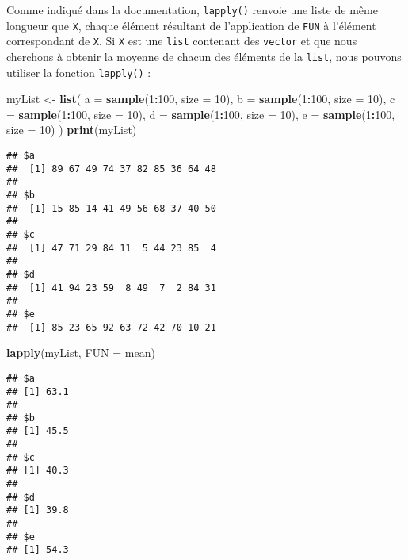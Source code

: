\documentclass[]{book}
\newenvironment{Shaded}{\begin{snugshade}}{\end{snugshade}}
\newcommand{\KeywordTok}[1]{\textcolor[rgb]{0.13,0.29,0.53}{\textbf{#1}}}
\newcommand{\DataTypeTok}[1]{\textcolor[rgb]{0.13,0.29,0.53}{#1}}
\newcommand{\DecValTok}[1]{\textcolor[rgb]{0.00,0.00,0.81}{#1}}
\newcommand{\StringTok}[1]{\textcolor[rgb]{0.31,0.60,0.02}{#1}}
\newcommand{\OperatorTok}[1]{\textcolor[rgb]{0.81,0.36,0.00}{\textbf{#1}}}
\newcommand{\NormalTok}[1]{#1}
\theoremstyle{definition}
\theoremstyle{definition}
\theoremstyle{definition}
\theoremstyle{remark}
\begin{document}
Comme indiqué dans la documentation, \texttt{lapply()} renvoie une liste
de même longueur que \texttt{X}, chaque élément résultant de
l'application de \texttt{FUN} à l'élément correspondant de \texttt{X}.
Si \texttt{X} est une \texttt{list} contenant des \texttt{vector} et que
nous cherchons à obtenir la moyenne de chacun des éléments de la
\texttt{list}, nous pouvons utiliser la fonction \texttt{lapply()} :

\begin{Shaded}
\begin{Highlighting}[]
\NormalTok{myList <-}\StringTok{ }\KeywordTok{list}\NormalTok{(}
  \DataTypeTok{a =} \KeywordTok{sample}\NormalTok{(}\DecValTok{1}\OperatorTok{:}\DecValTok{100}\NormalTok{, }\DataTypeTok{size =} \DecValTok{10}\NormalTok{), }
  \DataTypeTok{b =} \KeywordTok{sample}\NormalTok{(}\DecValTok{1}\OperatorTok{:}\DecValTok{100}\NormalTok{, }\DataTypeTok{size =} \DecValTok{10}\NormalTok{), }
  \DataTypeTok{c =} \KeywordTok{sample}\NormalTok{(}\DecValTok{1}\OperatorTok{:}\DecValTok{100}\NormalTok{, }\DataTypeTok{size =} \DecValTok{10}\NormalTok{), }
  \DataTypeTok{d =} \KeywordTok{sample}\NormalTok{(}\DecValTok{1}\OperatorTok{:}\DecValTok{100}\NormalTok{, }\DataTypeTok{size =} \DecValTok{10}\NormalTok{), }
  \DataTypeTok{e =} \KeywordTok{sample}\NormalTok{(}\DecValTok{1}\OperatorTok{:}\DecValTok{100}\NormalTok{, }\DataTypeTok{size =} \DecValTok{10}\NormalTok{)}
\NormalTok{)}
\KeywordTok{print}\NormalTok{(myList)}
\end{Highlighting}
\end{Shaded}

\begin{verbatim}
## $a
##  [1] 89 67 49 74 37 82 85 36 64 48
## 
## $b
##  [1] 15 85 14 41 49 56 68 37 40 50
## 
## $c
##  [1] 47 71 29 84 11  5 44 23 85  4
## 
## $d
##  [1] 41 94 23 59  8 49  7  2 84 31
## 
## $e
##  [1] 85 23 65 92 63 72 42 70 10 21
\end{verbatim}

\begin{Shaded}
\begin{Highlighting}[]
\KeywordTok{lapply}\NormalTok{(myList, }\DataTypeTok{FUN =}\NormalTok{ mean)}
\end{Highlighting}
\end{Shaded}

\begin{verbatim}
## $a
## [1] 63.1
## 
## $b
## [1] 45.5
## 
## $c
## [1] 40.3
## 
## $d
## [1] 39.8
## 
## $e
## [1] 54.3
\end{verbatim}
\end{document}
